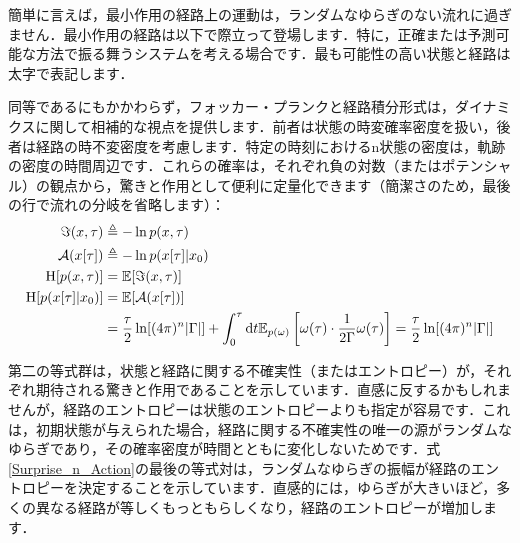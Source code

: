 \documentclass[a4paper, titlepage]{jsarticle}
\begin{document}
\par
簡単に言えば，最小作用の経路上の運動は，ランダムなゆらぎのない流れに過ぎません．最小作用の経路は以下で際立って登場します．特に，正確または予測可能な方法で振る舞うシステムを考える場合です．最も可能性の高い状態と経路は太字で表記します．
\par
同等であるにもかかわらず，フォッカー・プランクと経路積分形式は，ダイナミクスに関して相補的な視点を提供します．前者は状態の時変確率密度を扱い，後者は経路の時不変密度を考慮します．特定の時刻におけるn状態の密度は，軌跡の密度の時間周辺です．これらの確率は，それぞれ負の対数（またはポテンシャル）の観点から，驚きと作用として便利に定量化できます（簡潔さのため，最後の行で流れの分岐を省略します）：
\begin{equation}\label{Surprise_n_Action}
    \begin{aligned}
        \imaginary(x, \tau)&\triangleq-\ln p(x, \tau) \\
        \mathcal{A}(x[\tau])&\triangleq -\ln p(x[\tau] | x_0) \\
        \mathrm{H}[p(x, \tau)] &= \mathbb{E}[\imaginary(x, \tau)] \\
        \mathrm{H}[p(x[\tau] | x_0)] &= \mathbb{E}[\mathcal{A}(x[\tau])] \\
        &= \frac{\tau}{2} \ln [(4\pi)^n |\Gamma|] + \int_0^\tau \mathrm{d}t \mathbb{E}_{p(\omega)} \left[\omega(\tau)\cdot\frac{1}{2\Gamma} \omega(\tau)\right] = \frac{\tau}{2} \ln [(4\pi)^n |\Gamma|]
    \end{aligned}
\end{equation}
\par
第二の等式群は，状態と経路に関する不確実性（またはエントロピー）が，それぞれ期待される驚きと作用であることを示しています．直感に反するかもしれませんが，経路のエントロピーは状態のエントロピーよりも指定が容易です．これは，初期状態が与えられた場合，経路に関する不確実性の唯一の源がランダムなゆらぎであり，その確率密度が時間とともに変化しないためです．式\eqref{Surprise_n_Action}の最後の等式対は，ランダムなゆらぎの振幅が経路のエントロピーを決定することを示しています．直感的には，ゆらぎが大きいほど，多くの異なる経路が等しくもっともらしくなり，経路のエントロピーが増加します．
\end{document}

